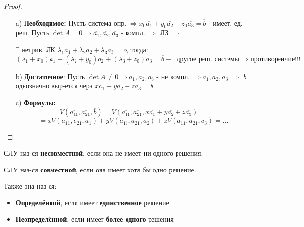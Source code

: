 \begin{proof}
\begin{itemize}
  \item[a) ] \textbf{Необходимое: }Пусть система опр. $\Rightarrow x_0 \overline{a_1} + y_0 \overline{a_2} + z_0 \overline{a_3} = \overline{b}$ - имеет. ед. реш.
    Пусть $\det A = 0 \Rightarrow \overline{a_1}, \overline{a_2}, \overline{a_3}$ - компл. $\Rightarrow$ ЛЗ $\Rightarrow$

    $\exists$ нетрив. ЛК $\lambda_1 \overline{a_1} + \lambda_2 \overline{a_2} + \lambda_3 \overline{a_3} =  \overline{o}$, тогда:
    \[
      (\lambda_1 + x_0) \overline{a_1} + (\lambda_2 + y_0) \overline{a_2} + (\lambda_3 + z_0) \overline{a_3} = \overline{b} - \text{ другое реш. системы $\Rightarrow$ противореичие!!!}
    \]
  \item [b) ] \textbf{Достаточное}:  Пусть $\det A \neq 0 \Rightarrow \overline{a_1}, \overline{a_2}, \overline{a_3}$ - не компл. $\Rightarrow \overline{a_{1}}, \overline{a_{2}}, \overline{a_3}$ $\Rightarrow$ $\overline{b}$ однозначно выр-ется черз $x\overline{a_1} + y\overline{a_2} + z\overline{a_3} = \overline{b}$

  \item [c) ] \textbf{Формулы: } \[
  V(\overline{a_{11}}, \overline{a_{21}}, \overline{b}) = V(\overline{a_{11}}, \overline{a_{21}}, x\overline{a_1} + y\overline{a_2} + z\overline{a_3}) = 
  \]
  \[
   = xV(\overline{a_{11}}, \overline{a_{21}}, \overline{a_1}) + yV(\overline{a_{11}}, \overline{a_{21}}, \overline{a_2}) + zV(\overline{a_{11}}, \overline{a_{21}}, \overline{a_3}) = ...
  \]
\end{itemize}
\end{proof}

\begin{definition}
СЛУ наз-ся \textbf{несовместной}, если она не имеет ни одного решения.
\end{definition}
\begin{definition}
СЛУ наз-ся \textbf{совместной}, если она имеет хотя бы одно решение.

Также она наз-ся:
\begin{itemize}
  \item \textbf{Определённой}, если имеет \textbf{единственное} решение \\
  \item \textbf{Неопределённой}, если имеет \textbf{более одного} решения
\end{itemize}
\end{definition}

